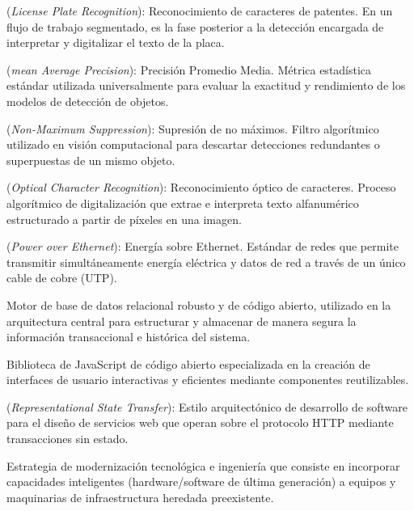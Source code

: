 \begin{description}[leftmargin=3cm, style=nextline]
    \item[LPR] (\textit{License Plate Recognition}): Reconocimiento de caracteres de patentes. En un flujo de trabajo segmentado, es la fase posterior a la detección encargada de interpretar y digitalizar el texto de la placa.
    
    \item[mAP] (\textit{mean Average Precision}): Precisión Promedio Media. Métrica estadística estándar utilizada universalmente para evaluar la exactitud y rendimiento de los modelos de detección de objetos.
    
    \item[NMS] (\textit{Non-Maximum Suppression}): Supresión de no máximos. Filtro algorítmico utilizado en visión computacional para descartar detecciones redundantes o superpuestas de un mismo objeto.
    
    \item[OCR] (\textit{Optical Character Recognition}): Reconocimiento óptico de caracteres. Proceso algorítmico de digitalización que extrae e interpreta texto alfanumérico estructurado a partir de píxeles en una imagen.
    
    \item[PoE] (\textit{Power over Ethernet}): Energía sobre Ethernet. Estándar de redes que permite transmitir simultáneamente energía eléctrica y datos de red a través de un único cable de cobre (UTP).
    
    \item[PostgreSQL] Motor de base de datos relacional robusto y de código abierto, utilizado en la arquitectura central para estructurar y almacenar de manera segura la información transaccional e histórica del sistema.
    
    \item[React] Biblioteca de JavaScript de código abierto especializada en la creación de interfaces de usuario interactivas y eficientes mediante componentes reutilizables.
    
    \item[REST] (\textit{Representational State Transfer}): Estilo arquitectónico de desarrollo de software para el diseño de servicios web que operan sobre el protocolo HTTP mediante transacciones sin estado.
    
    \item[Retrofit] Estrategia de modernización tecnológica e ingeniería que consiste en incorporar capacidades inteligentes (hardware/software de última generación) a equipos y maquinarias de infraestructura heredada preexistente.
    

\end{description}
